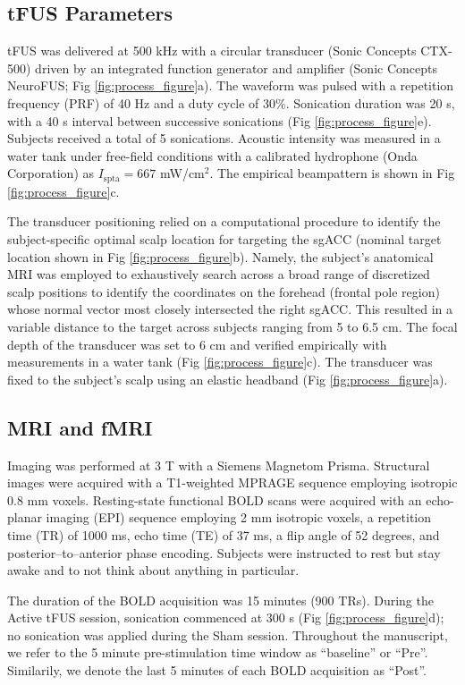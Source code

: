 \subsection*{tFUS Parameters}
\noindent
tFUS was delivered at 500 kHz with a circular transducer (Sonic Concepts CTX-500) driven by an integrated function generator and amplifier (Sonic Concepts NeuroFUS; Fig \ref{fig:process_figure}a). The waveform was pulsed with a repetition frequency (PRF) of 40 Hz and a duty cycle of 30\%. Sonication duration was 20 s, with a 40 s interval between successive sonications (Fig \ref{fig:process_figure}e). Subjects received a total of 5 sonications. Acoustic intensity was measured in a water tank under free-field conditions with a calibrated hydrophone (Onda Corporation) as $I_{\mathrm{spta}} = 667$ mW/cm$^2$. The empirical beampattern is shown in Fig \ref{fig:process_figure}c.

The transducer positioning relied on a computational procedure to identify the subject-specific optimal scalp location for targeting the sgACC (nominal target location shown in Fig \ref{fig:process_figure}b). Namely, the subject’s anatomical MRI was employed to exhaustively search across a broad range of discretized scalp positions to identify the coordinates on the forehead (frontal pole region) whose normal vector most closely intersected the right sgACC. This resulted in a variable distance to the target across subjects ranging from 5 to 6.5 cm. The focal depth of the transducer was set to 6 cm and verified empirically with measurements in a water tank (Fig \ref{fig:process_figure}c). The transducer was fixed to the subject's scalp using an elastic headband (Fig \ref{fig:process_figure}a). 

\subsection*{MRI and fMRI}
\noindent
Imaging was performed at 3 T with a Siemens Magnetom Prisma. Structural images were acquired with a T1-weighted MPRAGE sequence employing isotropic 0.8 mm voxels. Resting-state functional BOLD scans were acquired with an echo-planar imaging (EPI) sequence employing 2 mm isotropic voxels, a repetition time (TR) of 1000 ms, echo time (TE) of 37 ms, a flip angle of 52 degrees, and posterior–to–anterior phase encoding. Subjects were instructed to rest but stay awake and to not think about anything in particular.

The duration of the BOLD acquisition was 15 minutes (900 TRs). During the Active tFUS session, sonication commenced at 300 s (Fig \ref{fig:process_figure}d); no sonication was applied during the Sham session. Throughout the manuscript, we refer to the 5 minute pre-stimulation time window as ``baseline'' or ``Pre''. Similarily, we denote the last 5 minutes of each BOLD acquisition as ``Post''. 

